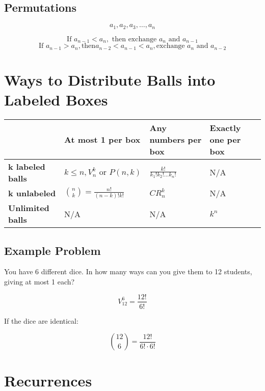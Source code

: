 \documentclass[11pt]{article}
\begin{document}
\subsection{Permutations}
\[
a_1, a_2, a_3, \dots, a_n
\]

\[ 
\text{If } a_{n - 1} < a_n, \text{ then exchange } a_n \text{ and } a_{n - 1}
\]
\[
\text{If } a_{n - 1} > a_n, \text{then} a_{n - 2} < a_{n - 1} < a_n, \text{exchange } a_n \text{ and } a_{n - 2}
\]

\renewcommand{\arraystretch}{2.5} %

\section*{Ways to Distribute Balls into Labeled Boxes}

\begin{center}
    \begin{tabular}{|>{\centering\arraybackslash}m{2.5cm}|>{\centering\arraybackslash}m{3.5cm}|>{\centering\arraybackslash}m{3.5cm}|>{\centering\arraybackslash}m{3.5cm}|}
    \hline
     & \textbf{At most 1 per box} & \textbf{Any numbers per box} & \textbf{Exactly one per box} \\
    \hline
    \textbf{k labeled balls} & $k \leq n, V_n^k \text{ or } P(n,k)$ & $\displaystyle\frac{k!}{k_1! k_2! \dots k_n!}$ & \cellcolor{gray!50} N/A \\  
    \hline
    \textbf{k unlabeled} & $\displaystyle\binom{n}{k} = \frac{n!}{(n-k)!k!}$ & $\displaystyle CR_n^k$ & \cellcolor{gray!50} N/A \\  
    \hline
    \textbf{Unlimited balls} & \cellcolor{gray!50} N/A & \cellcolor{gray!50} N/A & $\displaystyle k^n$ \\  
    \hline
    \end{tabular}
\end{center}

\subsection*{Example Problem}

You have 6 different dice. In how many ways can you give them to 12 students, giving at most 1 each?

\[
V_{12}^6 = \frac{12!}{6!}
\]

If the dice are identical:

\[
\binom{12}{6} = \frac{12!}{6!\cdot6!}
\]

\section{Recurrences}
\end{document}

